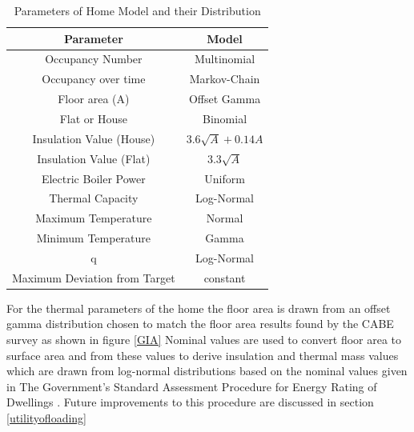\documentclass[a4paper, 10 pt, conference]{ieeeconf}  %
\begin{document}
\begin{table}[h]
\caption{Parameters of Home Model and their Distribution}
\label{modelpara}
\begin{center}
\begin{tabular}{|c||c|}
\hline
Parameter & Model\\
\hline \hline
Occupancy Number & Multinomial \\
\hline
Occupancy over time & Markov-Chain \\
\hline
Floor area (A) & Offset Gamma \\
\hline
Flat or House & Binomial  \\
\hline
Insulation Value (House) & $3.6\sqrt{A}+0.14A$\\
\hline
Insulation Value (Flat) & $3.3\sqrt{A}$\\
\hline
Electric Boiler Power & Uniform\\
\hline
Thermal Capacity & Log-Normal  \\
\hline
Maximum Temperature & Normal \\
\hline
Minimum Temperature & Gamma \\
\hline
q & Log-Normal \\
\hline
Maximum Deviation from Target & constant \\
\hline
\end{tabular}
\end{center}
\end{table}

For the thermal parameters of the home the floor area is drawn from an offset gamma distribution chosen to match the floor area results found by the CABE survey as shown in figure \ref{GIA} Nominal values are used to convert floor area to surface area and from these values to derive insulation and thermal mass values which are drawn from log-normal distributions based on the nominal values given in The Government’s Standard Assessment Procedure for Energy Rating of Dwellings \cite{SAP}. Future improvements to this procedure are discussed in section \ref{utilityofloading}
\end{document}
